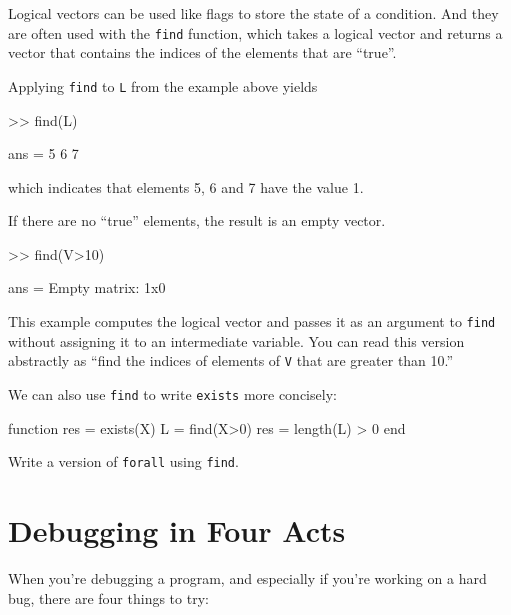Logical vectors can be used like flags to store the state of
a condition.  And they are often used with the {\tt find} function,
which takes a logical vector and returns a vector that contains
the indices of the elements that are ``true''.


Applying {\tt find} to {\tt L} from the example above yields

\begin{code}
>> find(L)

ans = 5     6     7
\end{code}

which indicates that elements 5, 6 and 7 have the value 1.

If there are no ``true'' elements, the result is an empty vector.

\begin{code}
>> find(V>10)

ans = Empty matrix: 1x0
\end{code}

This example computes the logical vector and passes it as an
argument to {\tt find} without assigning it to an intermediate
variable.  You can read this version abstractly as ``find
the indices of elements of {\tt V} that are greater than 10.''

We can also use {\tt find} to write {\tt exists} more concisely:

\begin{code}
function res = exists(X)
    L = find(X>0)
    res = length(L) > 0
end
\end{code}

\begin{ex}
Write a version of {\tt forall} using {\tt find}.
\end{ex}


\section{Debugging in Four Acts}


When you're debugging a program, and especially if you're working on a hard bug, there are four things to try:

